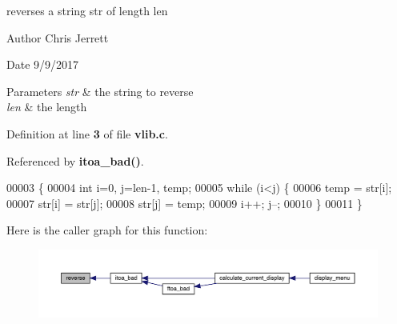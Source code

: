 reverses a string \textquotesingle{}str\textquotesingle{} of length \textquotesingle{}len\textquotesingle{} 

\begin{DoxyAuthor}{Author}
Chris Jerrett 
\end{DoxyAuthor}
\begin{DoxyDate}{Date}
9/9/2017 
\end{DoxyDate}

\begin{DoxyParams}{Parameters}
{\em str} & the string to reverse \\
\hline
{\em len} & the length \\
\hline
\end{DoxyParams}


Definition at line \textbf{ 3} of file \textbf{ vlib.\+c}.



Referenced by \textbf{ itoa\+\_\+bad()}.


\begin{DoxyCode}
00003                                  \{
00004     \textcolor{keywordtype}{int} i=0, j=len-1, temp;
00005     \textcolor{keywordflow}{while} (i<j) \{
00006         temp = str[i];
00007         str[i] = str[j];
00008         str[j] = temp;
00009         i++; j--;
00010     \}
00011 \}
\end{DoxyCode}
Here is the caller graph for this function\+:\nopagebreak
\begin{figure}[H]
\begin{center}
\leavevmode
\includegraphics[width=350pt]{vlib_8h_aad7fea725cb4b198ace1aa3df5051244_icgraph}
\end{center}
\end{figure}
